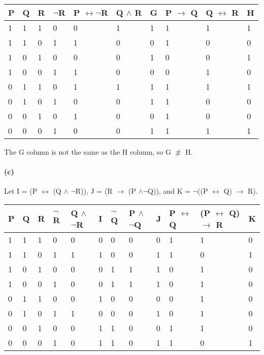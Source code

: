 \documentclass[10pt,letter]{article}
\begin{document}
\begin {center}
\begin{tabular}{|l|l|l|l|l|l|l|l|l|l|}
\hline
P & Q & R & $\neg$R & P $\leftrightarrow \neg$R & Q $\wedge$ R & G & P $\rightarrow$ Q & Q $\leftrightarrow$ R & H \\ \hline
1 & 1 & 1 & 0 & 0 & 1 & 1 & 1 & 1 & 1 \\
1 & 1 & 0 & 1 & 1 & 0 & 0 & 1 & 0 & 0 \\
1 & 0 & 1 & 0 & 0 & 0 & 1 & 0 & 0 & 1 \\
1 & 0 & 0 & 1 & 1 & 0 & 0 & 0 & 1 & 0 \\
0 & 1 & 1 & 0 & 1 & 1 & 1 & 1 & 1 & 1 \\
0 & 1 & 0 & 1 & 0 & 0 & 1 & 1 & 0 & 0 \\
0 & 0 & 1 & 0 & 1 & 0 & 0 & 1 & 0 & 0 \\
0 & 0 & 0 & 1 & 0 & 0 & 1 & 1 & 1 & 1 \\
\hline
\end{tabular}
\end{center}

The G column is not the same as the H column, so G $\not\equiv$ H.

\paragraph{(c)} 

Let I = (P $\leftrightarrow$ (Q $\wedge$ $\neg$R)), J = (R $\rightarrow$ (P $\wedge \neg$Q)), and K = $\neg$((P $\leftrightarrow$ Q) $\rightarrow$ R).

\begin{center}
\begin{tabular}{|l|l|l|l|l|l|l|l|l|l|l|l|}
\hline
P & Q & R & $\neg$R & Q $\wedge$ $\neg$R & I & $\neg$Q & P $\wedge$ $\neg$Q & J & P $\leftrightarrow$ Q & (P $\leftrightarrow$ Q) $\rightarrow$ R & K \\ \hline
1 & 1 & 1 & 0 & 0 & 0 & 0 & 0 & 0 & 1 & 1 & 0 \\
1 & 1 & 0 & 1 & 1 & 1 & 0 & 0 & 1 & 1 & 0 & 1 \\
1 & 0 & 1 & 0 & 0 & 0 & 1 & 1 & 1 & 0 & 1 & 0 \\
1 & 0 & 0 & 1 & 0 & 0 & 1 & 1 & 1 & 0 & 1 & 0 \\
0 & 1 & 1 & 0 & 0 & 1 & 0 & 0 & 0 & 0 & 1 & 0 \\
0 & 1 & 0 & 1 & 1 & 0 & 0 & 0 & 1 & 0 & 1 & 0 \\
0 & 0 & 1 & 0 & 0 & 1 & 1 & 0 & 0 & 1 & 1 & 0 \\
0 & 0 & 0 & 1 & 0 & 1 & 1 & 0 & 1 & 1 & 0 & 1 \\ 
\hline
\end{tabular}
\end {center}
\end{document}
